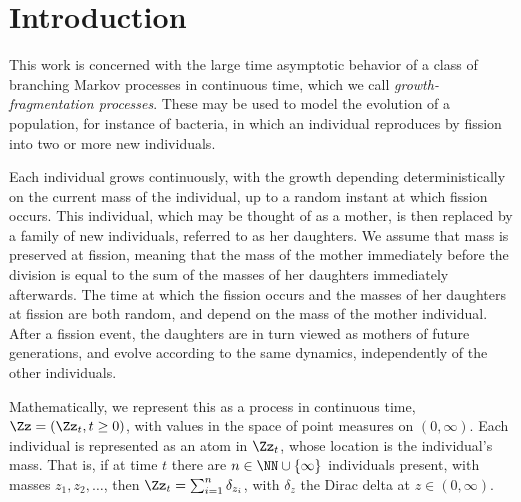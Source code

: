 \section{Introduction}
This work is concerned with the large time asymptotic behavior of a class of branching Markov processes in continuous time, which we call \emph{growth-fragmentation processes}. These may be used to model the evolution of a population, for instance of bacteria, in which an individual reproduces by fission into two or more new individuals.

Each individual grows continuously, with the growth depending deterministically on the current mass of the individual, up to a random instant at which fission occurs. This individual, which may be thought of as a mother, is then replaced by a family of new individuals, referred to as her daughters. We assume that mass is preserved at fission, meaning that the mass of the mother immediately before the division is equal to the sum of the masses of her daughters immediately afterwards. The time at which the fission occurs and the masses of her daughters at fission are both random, and depend on the mass of the mother individual. After a fission event, the daughters are in turn viewed as mothers of future generations, and evolve according to the same dynamics, independently of the other individuals.

Mathematically, we represent this as a process in continuous time, $\Zz=(\Zz_t, t\geq 0)$, with values in the space of point measures on $(0,\infty)$. Each individual is represented as an atom in $\Zz_t$, whose location is the individual's mass. That is, if at time $t$ there are $n\in \NN \cup\{\infty\}$ individuals present, with masses $z_1,z_2,\dotsc$, then $\Zz_t = \sum_{i=1}^n \delta_{z_i}$, with $\delta_z$ the Dirac delta at $z \in (0,\infty)$.

